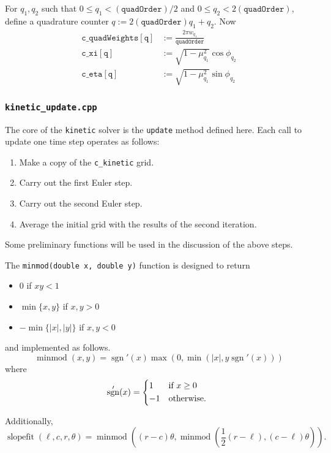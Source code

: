 \documentclass{article}
\newcommand{\quadorder}{\ensuremath{\mathtt{quadOrder}}\xspace}
\newcommand{\assign}{\ensuremath{\mathrel{\texttt{:=}}}}
\DeclareMathOperator{\minmod}{minmod}
\DeclareMathOperator{\slopefit}{slopefit}
\DeclareMathOperator{\sgn}{sgn}
\newcommand{\kinetic}{\texttt{kinetic}\xspace}
\begin{document}
For $q_1,q_2$ such that $0 \leq q_1 < (\quadorder) / 2$ and
$0 \leq q_2 < 2(\quadorder)$, define a quadrature counter
$q \assign 2(\quadorder)q_1 + q_2$. Now 
\begin{align}
    \mathtt{c\_quadWeights[q]} &\assign \frac{2\pi w_{q_1}}{\quadorder} \\
    \mathtt{c\_xi[q]} &\assign \sqrt{1 - \mu_{q_1}^2} \cos \phi_{q_2} \\
    \mathtt{c\_eta[q]} &\assign \sqrt{1 - \mu_{q_1}^2} \sin \phi_{q_2}
\end{align}

\subsubsection{\texttt{kinetic\_update.cpp}}
\label{src:kinetic_update.cpp}
The core of the \kinetic solver is the \texttt{update} method defined here. Each
call to update one time step operates as follows:
\begin{enumerate}
    \item Make a copy of the \texttt{c\_kinetic} grid.
    \item Carry out the first Euler step.
    \item Carry out the second Euler step.
    \item Average the initial grid with the results of the second iteration.
\end{enumerate}
Some preliminary functions will be used in the discussion of the above steps.

The \texttt{minmod(double x, double y)} function is designed to return
\begin{itemize}
    \item 0 if $xy < 1$
    \item $\min\{x, y\}$ if $x,y > 0$
    \item $-\min\{|x|, |y|\}$ if $x,y < 0$
\end{itemize}
and implemented as follows.
\begin{equation}
    \minmod (x, y) = \sgn'(x) \max\left(0, \min\left(|x|, y \sgn'(x)\right)\right)
\end{equation}
where
\begin{equation}
    \sgn'(x) =
    \begin{dcases*}
        1  & if $x \geq 0$ \\
        -1 & otherwise.
    \end{dcases*}
\end{equation}

Additionally,
\begin{equation}
    \slopefit(\ell, c, r, \theta) = \minmod\left((r - c)\theta,
        \minmod\left(\frac{1}{2}(r - \ell), (c-\ell)\theta\right)\right).
\end{equation}
\end{document}
